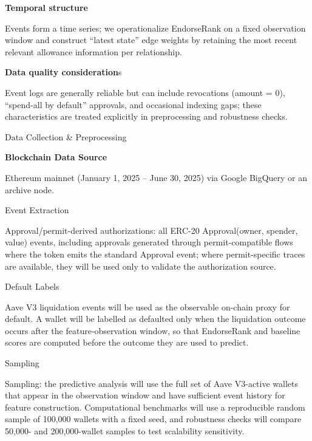 \documentclass[
]{article}
\begin{document}
\textbf{Temporal structure}

Events form a time series; we operationalize EndorseRank on a fixed observation window and construct ``latest state'' edge weights by retaining the most recent relevant allowance information per relationship.

\textbf{Data quality consideration}s

Event logs are generally reliable but can include revocations (amount = 0), ``spend-all by default'' approvals, and occasional indexing gaps; these characteristics are treated explicitly in preprocessing and robustness checks.

Data Collection \& Preprocessing

\textbf{Blockchain Data Source}

Ethereum mainnet (January 1, 2025 -- June 30, 2025) via Google BigQuery or an archive node.

Event Extraction

Approval/permit-derived authorizations: all ERC-20 Approval(owner, spender, value) events, including approvals generated through permit-compatible flows where the token emits the standard Approval event; where permit-specific traces are available, they will be used only to validate the authorization source.

Default Labels

Aave V3 liquidation events will be used as the observable on-chain proxy for default. A wallet will be labelled as defaulted only when the liquidation outcome occurs after the feature-observation window, so that EndorseRank and baseline scores are computed before the outcome they are used to predict.

Sampling

Sampling: the predictive analysis will use the full set of Aave V3-active wallets that appear in the observation window and have sufficient event history for feature construction. Computational benchmarks will use a reproducible random sample of 100,000 wallets with a fixed seed, and robustness checks will compare 50,000- and 200,000-wallet samples to test scalability sensitivity.
\end{document}
